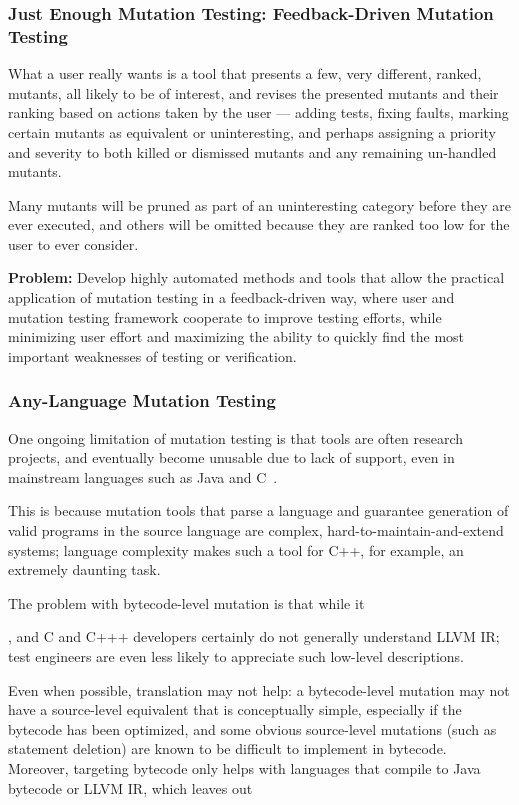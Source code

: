 \subsubsection{Just Enough Mutation Testing: Feedback-Driven Mutation Testing}


What a user really wants is a tool that presents a few, very different, ranked,
mutants, all likely to be of interest, and revises the presented mutants and
their ranking based on actions taken by the user --- adding tests, fixing
faults, marking certain mutants as equivalent or uninteresting, and perhaps
assigning a priority and severity to both killed or dismissed mutants and any
remaining un-handled mutants. 


Many mutants will be
pruned as part of an uninteresting category before they are ever executed, and
others will be omitted because they are ranked too low for the user to ever
consider. 

\begin{framed}
{\bf Problem:}  Develop highly automated methods and tools that allow the
practical application of mutation testing in a feedback-driven way, where user
and mutation testing framework cooperate to improve testing efforts, while
minimizing user effort and maximizing the ability to quickly find the most
important weaknesses of testing or verification. 
\end{framed}

\subsubsection{Any-Language Mutation Testing}

One ongoing limitation of mutation testing is that tools are often research
projects, and eventually become unusable due to lack of support, even in
mainstream languages such as Java and C~\cite{MutChoice}.

This is because mutation tools that parse a language and guarantee generation of
valid programs in the source language are complex, hard-to-maintain-and-extend
systems; language complexity makes such a tool for C++, for example, an
extremely daunting task.   

The problem with bytecode-level mutation is that while it

, and C and C+++ developers certainly do not generally understand LLVM IR; test
engineers are even less likely to appreciate such low-level descriptions.  

Even when possible, translation may not help: a bytecode-level mutation may not
have a source-level equivalent that is conceptually simple, especially if the
bytecode has been optimized, and some obvious source-level mutations (such as
statement deletion) are known to be difficult to implement in bytecode.
Moreover, targeting bytecode only helps with languages that compile to Java
bytecode or LLVM IR, which leaves out 

